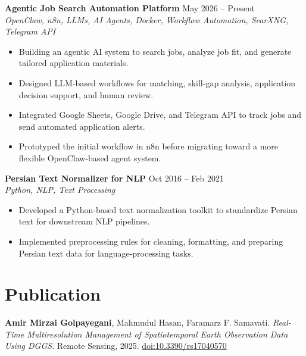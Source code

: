 \documentclass[a4paper,10pt]{article}
\newcommand{\resumeSubheading}[4]{
    \textbf{#1} \hfill #2 \\
    \textit{#3} \hfill \textit{#4}
}
\begin{document}
\noindent
\textbf{Agentic Job Search Automation Platform} \hfill May 2026 -- Present \\
\textit{OpenClaw, n8n, LLMs, AI Agents, Docker, Workflow Automation, SearXNG, Telegram API}
\begin{itemize}[leftmargin=0.25in]
    \item Building an agentic AI system to search jobs, analyze job fit, and generate tailored application materials.
    \item Designed LLM-based workflows for matching, skill-gap analysis, application decision support, and human review.
    \item Integrated Google Sheets, Google Drive, and Telegram API to track jobs and send automated application alerts.
    \item Prototyped the initial workflow in n8n before migrating toward a more flexible OpenClaw-based agent system.
\end{itemize}

\noindent
\textbf{Persian Text Normalizer for NLP} \hfill Oct 2016 -- Feb 2021 \\
\textit{Python, NLP, Text Processing}
\begin{itemize}[leftmargin=0.25in]
    \item Developed a Python-based text normalization toolkit to standardize Persian text for downstream NLP pipelines.
    \item Implemented preprocessing rules for cleaning, formatting, and preparing Persian text data for language-processing tasks.
\end{itemize}

\section*{Publication}

\textbf{Amir Mirzai Golpayegani}, Mahmudul Hasan, Faramarz F. Samavati. 
\textit{Real-Time Multiresolution Management of Spatiotemporal Earth Observation Data Using DGGS}. 
Remote Sensing, 2025. \href{https://doi.org/10.3390/rs17040570}{doi:10.3390/rs17040570}



\end{document}
